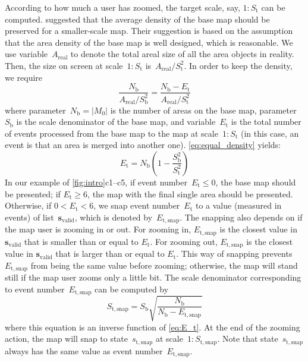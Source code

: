 \documentclass[twocolumn]{svjour3}          %
\begin{document}
According to how much a user has zoomed,
the target scale, say, $1:S_\mathrm{t}$ can be computed.
\citet{Huang2016Webmap} suggested that 
the average density of the base map should be preserved 
for a smaller-scale map.
Their suggestion is based on the assumption that 
the area density of the base map is well designed, which is reasonable.
We use variable~$A_\mathrm{real}$ to denote the total areal size of 
all the area objects in reality.
Then, the size on screen at scale~$1:S_\mathrm{t}$ 
is~$A_\mathrm{real} \big/ S^2_\mathrm{t}$.
In order to keep the density, we require
\begin{equation}
\label{eq:equal_density}
\frac{N_\mathrm{b}}{A_\mathrm{real} \big/ S^2_\mathrm{b}} =
\frac{N_\mathrm{b}-E_\mathrm{t}}{A_\mathrm{real} \big/ S^2_\mathrm{t}}
\end{equation}
where parameter~$N_\mathrm{b} = |M_0|$ 
is the number of areas on the base map,
parameter~$S_\mathrm{b}$ is the scale denominator of the base map,
and variable~$E_\mathrm{t}$ is the total number of events 
processed from the base map to the map at scale~$1:S_\mathrm{t}$
(in this case, an event is that an area is merged into another one).
\eq\ref{eq:equal_density} yields:
\begin{equation}
\label{eq:E_t}
E_\mathrm{t} = N_\mathrm{b} \left(1-\frac{S^2_\mathrm{b}}{S^2_\mathrm{t}}\right)
\end{equation}
In our example of \figs\ref{fig:intro}c1--c5,
if event number~$E_\mathrm{t} \le 0$, the base map should be presented;
if $E_\mathrm{t} \ge 6$,
the map with the final single area should be presented.
Otherwise, if $0<E_\mathrm{t} < 6$, we snap event number~$E_\mathrm{t}$ 
to a value (measured in events) of 
list~$\mathrm{\textbf{s}_{valid}}$,
which is denoted by~$E_\mathrm{t,snap}$.
The snapping also depends on if the map user is zooming in or out.
For zooming in, $E_\mathrm{t,snap}$ 
is the closest value in $\mathrm{\textbf{s}_{valid}}$ that is 
smaller than or equal to $E_\mathrm{t}$.
For zooming out, $E_\mathrm{t,snap}$ 
is the closest value in $\mathrm{\textbf{s}_{valid}}$ that is 
larger than or equal to $E_\mathrm{t}$.
This way of snapping prevents $E_\mathrm{t,snap}$ from
being the same value before zooming;
otherwise, the map will stand still 
if the map user zooms only a little bit.
The scale denominator corresponding to event number~$E_\mathrm{t,snap}$
can be computed by 
\begin{equation}
\label{eq:S_t_snap}
S_\mathrm{t,snap} = S_\mathrm{b} \sqrt{\frac{N_\mathrm{b}}{N_\mathrm{b}-E_\mathrm{t,snap}}}
\end{equation}
where this equation is an inverse function of \eq\ref{eq:E_t}.
At the end of the zooming action, 
the map will snap to state~$s_\mathrm{t,snap}$
at scale~$1:S_\mathrm{t,snap}$.
Note that state~$s_\mathrm{t,snap}$ always has 
the same value as event number~$E_\mathrm{t,snap}$.
\end{document}
